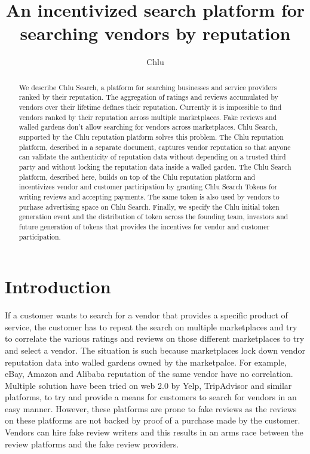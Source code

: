 \documentclass[a4paper]{article}
\title{An incentivized search platform for searching vendors by reputation}
\author{
  Chlu
}
\begin{document}
\maketitle

\begin{abstract}

  We describe Chlu Search, a platform for searching businesses and
  service providers ranked by their reputation. The aggregation of
  ratings and reviews accumulated by vendors over their lifetime
  defines their reputation. Currently it is impossible to find vendors
  ranked by their reputation across multiple marketplaces. Fake
  reviews and walled gardens don't allow searching for vendors across
  marketplaces. Chlu Search, supported by the Chlu reputation platform
  solves this problem. The Chlu reputation platform, described in a
  separate document, captures vendor reputation so that anyone can
  validate the authenticity of reputation data without depending on a
  trusted third party and without locking the reputation data inside a
  walled garden. The Chlu Search platform, described here, builds on
  top of the Chlu reputation platform and incentivizes vendor and
  customer participation by granting Chlu Search Tokens for writing
  reviews and accepting payments. The same token is also used by
  vendors to purhase advertising space on Chlu Search. Finally, we
  specify the Chlu initial token generation event and the distribution
  of token across the founding team, investors and future generation
  of tokens that provides the incentives for vendor and customer
  participation.

\end{abstract}

\section{Introduction}

If a customer wants to search for a vendor that provides a specific
product of service, the customer has to repeat the search on multiple
marketplaces and try to correlate the various ratings and reviews on
those different marketplaces to try and select a vendor. The situation
is such because marketplaces lock down vendor reputation data into
walled gardens owned by the marketpalce. For example, eBay, Amazon and
Alibaba reputation of the same vendor have no correlation. Multiple
solution have been tried on web 2.0 by Yelp, TripAdvisor and similar
platforms, to try and provide a means for customers to search for
vendors in an easy manner. However, these platforms are prone to fake
reviews as the reviews on these platforms are not backed by proof of a
purchase made by the customer. Vendors can hire fake review writers
and this results in an arms race between the review platforms and the
fake review providers.
\end{document}
